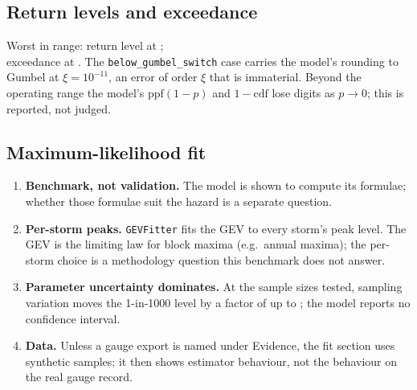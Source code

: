 \documentclass[11pt,a4paper]{article}
\begin{document}
\mkmvalidation



\subsection{Return levels and exceedance}
Worst in range: return level at \texttt{\bmWorstLevelAt}; \\
exceedance at \texttt{\bmWorstExcAt}. The \texttt{below\_gumbel\_switch} case carries the
model's rounding to Gumbel at $\xi=10^{-11}$, an error of order $\xi$ that is
immaterial. Beyond the
operating range the model's $\mathrm{ppf}(1-p)$ and $1-\mathrm{cdf}$ lose
digits as $p\to0$; this is reported, not judged.



\subsection{Maximum-likelihood fit}


\mkmlimitations

\begin{enumerate}[leftmargin=*]
\item \textbf{Benchmark, not validation.} The model is shown to compute its
  formulae; whether those formulae suit the hazard is a separate question.
\item \textbf{Per-storm peaks.} \texttt{GEVFitter} fits the GEV to every
  storm's peak level. The GEV is the limiting law for block maxima (e.g.\ annual
  maxima); the per-storm choice is a methodology question this benchmark does
  not answer.
\item \textbf{Parameter uncertainty dominates.} At the sample sizes tested,
  sampling variation moves the 1-in-1000 level by a factor of up to \bmRatioMax;
  the model reports no confidence interval.
\item \textbf{Data.} Unless a gauge export is named under Evidence, the fit
  section uses synthetic samples; it then shows estimator behaviour, not the
  behaviour on the real gauge record.
\end{enumerate}

\end{document}
